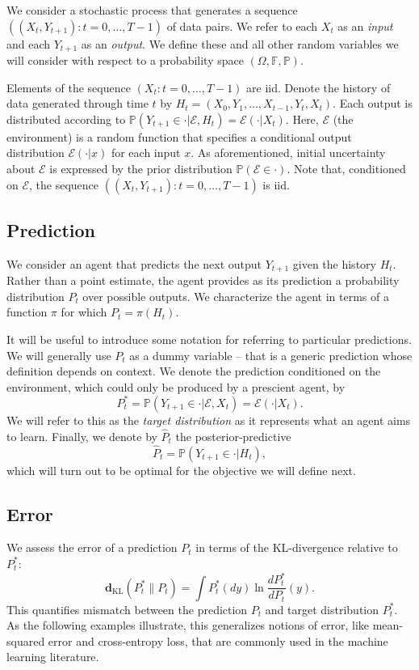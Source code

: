 \documentclass[twoside,11pt]{article}
\def\environment{\mathcal{E}}
\def\KL{\mathbf{d}_{\mathrm{KL}}}
\def\F{\mathbb{F}}
\def\Pr{\mathbb{P}}
\begin{document}
We consider a stochastic process that generates a sequence $((X_t, Y_{t+1}): t=0,\ldots,T-1)$ of data pairs. We refer to each $X_t$ as an {\it input} and each $Y_{t+1}$ as an {\it output}. We define these and all other random variables we will consider with respect to a probability space $(\Omega, \F, \Pr)$.  

Elements of the sequence $(X_t: t=0,\ldots,T-1)$ are iid. Denote the history of data generated through time $t$ by $H_t = (X_0, Y_1,\ldots,X_{t-1}, Y_t, X_t)$.  Each output is distributed according to $\Pr(Y_{t+1} \in \cdot | \environment, H_t) = \environment(\cdot|X_t)$. Here, $\environment$ (the environment) is a random function that specifies a conditional output distribution $\environment(\cdot|x)$ for each input $x$. As aforementioned, initial uncertainty about $\environment$ is expressed by the prior distribution $\Pr(\environment \in \cdot)$. Note that, conditioned on $\environment$, the sequence $((X_t, Y_{t+1}): t=0,\ldots,T-1)$ is iid.

\subsection{Prediction}
We consider an agent that predicts the next output $Y_{t+1}$ given the history $H_t$.  Rather than a point estimate, the agent provides as its prediction a probability distribution $P_t$ over possible outputs.  We characterize the agent in terms of a function $\pi$ for which $P_t = \pi(H_t)$.

It will be useful to introduce some notation for referring to particular predictions.  We will generally use $P_t$ as a dummy variable -- that is a generic prediction whose definition depends on context.  We denote the prediction conditioned on the environment, which could only be produced by a prescient agent, by
$$P^*_t = \Pr(Y_{t+1} \in \cdot |\environment, X_t) = \environment(\cdot|X_t).$$
We will refer to this as the {\it target distribution} as it represents what an agent aims to learn.
Finally, we denote by $\hat{P}_t$ the posterior-predictive 
$$\hat{P}_t = \Pr(Y_{t+1} \in \cdot |H_t),$$
which will turn out to be optimal for the objective we will define next.



\subsection{Error}
We assess the error of a prediction $P_t$ in terms of the KL-divergence relative to $P^*_t$:
$$\KL(P^*_t \| P_t)
= \int P^*_t(dy)  \ln\frac{d P^*_t}{d P_t}(y).$$
This quantifies mismatch between the prediction $P_t$ and target distribution $P^*_t$.  As the following examples illustrate, this generalizes notions of error, like mean-squared error and cross-entropy loss, that are commonly used in the machine learning literature.
\end{document}
